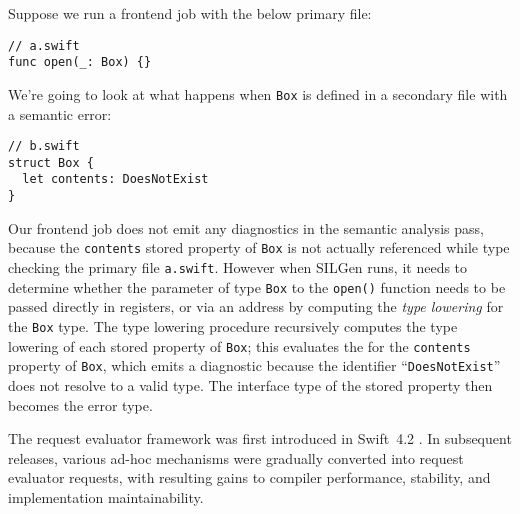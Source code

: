 \documentclass[../generics]{subfiles}
\begin{document}
\begin{example}
Suppose we run a frontend job with the below primary file:
\begin{Verbatim}
// a.swift
func open(_: Box) {}
\end{Verbatim}
We're going to look at what happens when \texttt{Box} is defined in a secondary file with a semantic error:
\begin{Verbatim}
// b.swift
struct Box {
  let contents: DoesNotExist
}
\end{Verbatim}

Our frontend job does not emit any diagnostics in the semantic analysis pass, because the \texttt{contents} stored property of \texttt{Box} is not actually referenced while type checking the primary file \texttt{a.swift}. However when SILGen runs, it needs to determine whether the parameter of type \texttt{Box} to the \texttt{open()} function needs to be passed directly in registers, or via an address by computing the \emph{type lowering} for the \texttt{Box} type. The type lowering procedure recursively computes the type lowering of each stored property of \texttt{Box}; this evaluates the  for the \texttt{contents} property of \texttt{Box}, which emits a diagnostic because the identifier ``\texttt{DoesNotExist}'' does not resolve to a valid type. The interface type of the stored property then becomes the error type.
\end{example}

The request evaluator framework was first introduced in Swift~4.2 \cite{reqeval}. In subsequent releases, various ad-hoc mechanisms were gradually converted into request evaluator requests, with resulting gains to compiler performance, stability, and implementation maintainability.
\end{document}
